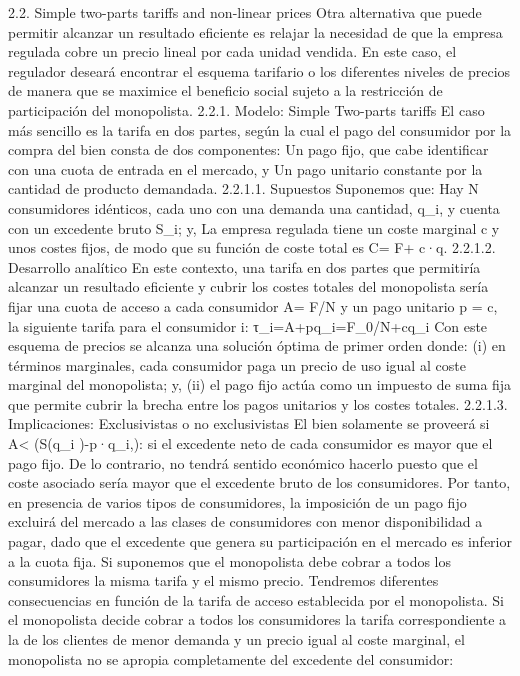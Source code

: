 \documentclass[10pt,a4paper]{article}
\begin{document}
2.2. Simple two-parts tariffs and non-linear prices
Otra alternativa que puede permitir alcanzar un resultado eficiente es relajar la necesidad de que la empresa regulada cobre un precio lineal por cada unidad vendida. En este caso, el regulador deseará encontrar el esquema tarifario o los diferentes niveles de precios de manera que se maximice el beneficio social sujeto a la restricción de participación del monopolista. 
2.2.1. Modelo: Simple Two-parts tariffs 
El caso más sencillo es la tarifa en dos partes, según la cual el pago del consumidor por la compra del bien consta de dos componentes:
	Un pago fijo, que cabe identificar con una cuota de entrada en el mercado, y 
	Un pago unitario constante por la cantidad de producto demandada.
2.2.1.1. Supuestos
Suponemos que:
	Hay N consumidores idénticos, cada uno con una demanda una cantidad, q_i,  y cuenta con un excedente bruto S_i; y, 
	La empresa regulada tiene un coste marginal c y unos costes fijos, de modo que su función de coste total es C= F+ c·q. 
2.2.1.2. Desarrollo analítico
En este contexto, una tarifa en dos partes que permitiría alcanzar un resultado eficiente y cubrir los costes totales del monopolista sería fijar una cuota de acceso a cada consumidor A= F/N y un pago unitario p = c, la siguiente tarifa para el consumidor i:
τ_i=A+pq_i=F_0/N+cq_i
Con este esquema de precios  se alcanza una solución óptima de primer orden donde: (i) en términos marginales, cada consumidor paga un precio de uso igual al coste marginal del monopolista; y, (ii) el pago fijo actúa como un impuesto de suma fija que permite cubrir la brecha entre los pagos unitarios y los costes totales.
2.2.1.3. Implicaciones: Exclusivistas o no exclusivistas
El bien solamente se proveerá si A< (S(q_i )-p·q_i,): si el excedente neto de cada consumidor es mayor que el pago fijo. De lo contrario, no tendrá sentido económico hacerlo puesto que el coste asociado sería mayor que el excedente bruto de los consumidores.  Por tanto, en presencia de varios tipos de consumidores, la imposición de un pago fijo excluirá del mercado a las clases de consumidores con menor disponibilidad a pagar, dado que el excedente que genera su participación en el mercado es inferior a la cuota fija. Si suponemos que el monopolista debe cobrar a todos los consumidores la misma tarifa y el mismo precio. Tendremos diferentes consecuencias en función de la tarifa de acceso establecida por el monopolista.
Si el monopolista decide cobrar a todos los consumidores la tarifa correspondiente a la de los clientes de menor demanda y un precio igual al coste marginal, el monopolista no se apropia completamente del excedente del consumidor:
 
\end{document}
